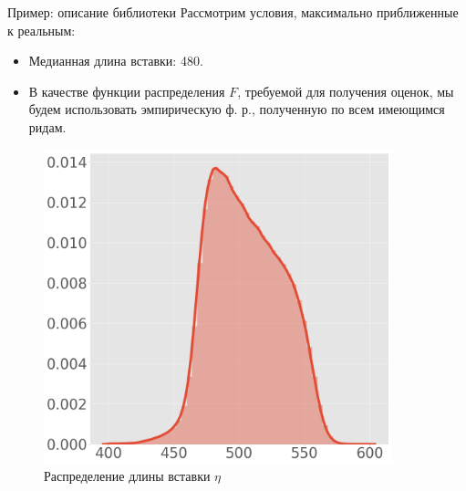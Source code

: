 \documentclass[unicode, notheorems]{beamer}
\begin{document}
\begin{frame}{Пример: описание библиотеки}
	Рассмотрим условия, максимально приближенные к реальным:
	\medskip
	
	\begin{minipage}{0.55\textwidth}
		\begin{itemize}
			\item Медианная длина вставки: 480.
			\item В качестве функции распределения $F$, требуемой для получения оценок, мы будем использовать эмпирическую ф. р., полученную по всем имеющимся ридам.
		\end{itemize}
	\end{minipage}%
	\begin{minipage}{0.45\textwidth}
	\begin{figure}
		\includegraphics[width=0.9\textwidth]{fig/real-reads/bad-lib/hist}
		\caption{Распределение длины вставки $\eta$}
	\end{figure}
	\end{minipage}
\end{frame}
\end{document}
